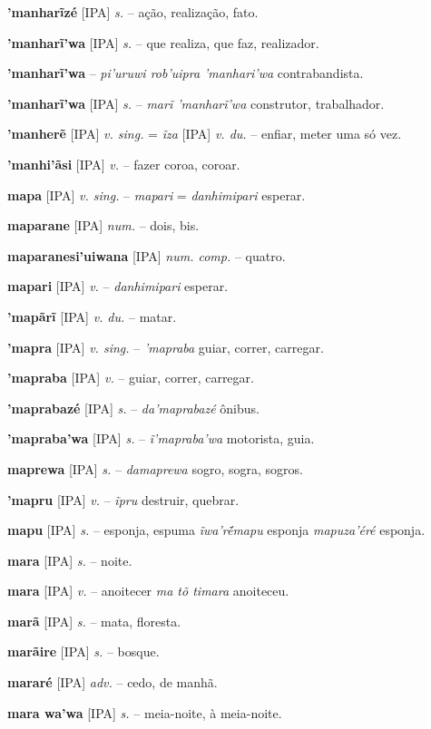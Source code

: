 \textbf{'manharĩzé} [IPA] \textit{s.} -- ação, realização, fato.

\textbf{'manharĩ'wa} [IPA] \textit{s.} -- que realiza, que faz, realizador.

\textbf{'manharĩ'wa} -- \textit{pi'uruwi rob'uipra 'manhari'wa} contrabandista.

\textbf{'manharĩ'wa} [IPA] \textit{s.} -- \textit{marĩ 'manharĩ'wa} construtor, trabalhador.

\textbf{'manherẽ} [IPA] \textit{v. sing.} = \textit{ĩza} [IPA] \textit{v. du.} -- enfiar, meter uma só vez.

\textbf{'manhi'ãsi} [IPA] \textit{v.} -- fazer coroa, coroar.

\textbf{mapa} [IPA] \textit{v. sing.} -- \textit{mapari} = \textit{danhimipari} esperar.

\textbf{maparane} [IPA] \textit{num.} -- dois, bis.

\textbf{maparanesi'uiwana} [IPA] \textit{num. comp.} -- quatro.

\textbf{mapari} [IPA] \textit{v.} -- \textit{danhimipari} esperar.

\textbf{'mapãrĩ} [IPA] \textit{v. du.} -- matar.

\textbf{'mapra} [IPA] \textit{v. sing.} -- \textit{'mapraba} guiar, correr, carregar.

\textbf{'mapraba} [IPA] \textit{v.} -- guiar, correr, carregar.

\textbf{'maprabazé} [IPA] \textit{s.} -- \textit{da'maprabazé} ônibus.

\textbf{'mapraba'wa} [IPA] \textit{s.} -- \textit{ĩ'mapraba'wa} motorista, guia.

\textbf{maprewa} [IPA] \textit{s.} -- \textit{damaprewa} sogro, sogra, sogros.

\textbf{'mapru} [IPA] \textit{v.} -- \textit{ĩpru} destruir, quebrar.

\textbf{mapu} [IPA] \textit{s.} -- esponja, espuma  \textit{ĩwa'ré̃mapu} esponja  \textit{mapuza'éré} esponja.

\textbf{mara} [IPA] \textit{s.} -- noite.

\textbf{mara} [IPA] \textit{v.} -- anoitecer  \textit{ma tõ timara} anoiteceu.

\textbf{marã} [IPA] \textit{s.} -- mata, floresta.

\textbf{marãire} [IPA] \textit{s.} -- bosque.

\textbf{mararé} [IPA] \textit{adv.} -- cedo, de manhã.

\textbf{mara wa'wa} [IPA] \textit{s.} -- meia-noite, à meia-noite.

